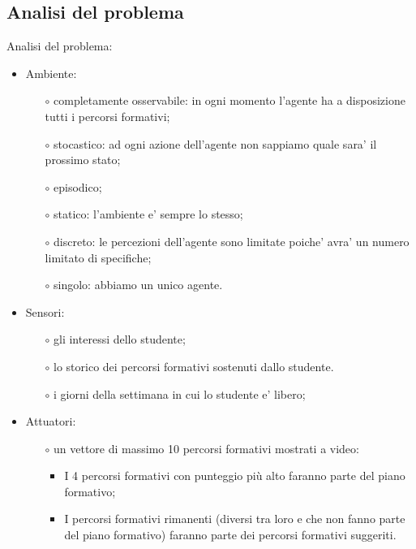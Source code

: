 \documentclass[10pt,a4paper]{article}
\begin{document}
    \subsection{Analisi del problema}
      \label{analisiDelProblemaSubsection}
      Analisi del problema:\\
      \begin{itemize}
        \item Ambiente:
        \begin{itemize}
          \item[$\circ$] completamente osservabile: in ogni momento l'agente ha a disposizione tutti i percorsi formativi;
          \item[$\circ$] stocastico: ad ogni azione dell'agente non sappiamo quale sara' il prossimo stato;
          \item[$\circ$] episodico;
          \item[$\circ$] statico: l'ambiente e' sempre lo stesso;
          \item[$\circ$] discreto: le percezioni dell'agente sono limitate poiche' avra' un numero limitato di specifiche;
          \item[$\circ$] singolo: abbiamo un unico agente.
        \end{itemize}
        
        \item Sensori:
        \begin{itemize}
          \item[$\circ$] gli interessi dello studente;
          \item[$\circ$] lo storico dei percorsi formativi sostenuti dallo studente.
          \item[$\circ$] i giorni della settimana in cui lo studente e' libero;
        \end{itemize}
        
        \item Attuatori:
        \begin{itemize}
          \item[$\circ$] un vettore di massimo 10 percorsi formativi mostrati a video:
          \begin{itemize}
            \item I 4 percorsi formativi con punteggio più alto faranno parte del piano formativo;
            \item I percorsi formativi rimanenti (diversi tra loro e che non fanno parte 
            del piano formativo) faranno parte dei percorsi formativi suggeriti. 
          \end{itemize}
        \end{itemize}
      \end{itemize}%
        
\end{document}
